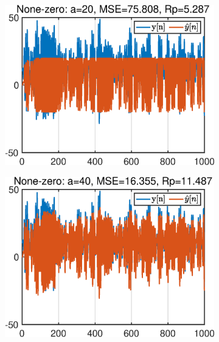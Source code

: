 \begin{figure}[htb]
     \centering
     \hspace{-0.4cm}
     \begin{subfigure}[b]{0.33\textwidth}
         \centering
         \includegraphics[width=\textwidth]{fig/4/43b1.eps}
     \end{subfigure}
    \hspace{-0.2cm}
     \begin{subfigure}[b]{0.33\textwidth}
         \centering
         \includegraphics[width=\textwidth]{fig/4/43b2.eps}
     \end{subfigure}
    \hspace{-0.2cm}
     \begin{subfigure}[b]{0.33\textwidth}

\end{subfigure}
\end{figure}
